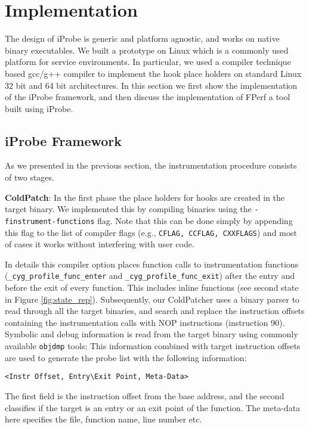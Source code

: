 \section{Implementation}
\label{sec:Implementation}

The design of iProbe is generic and platform agnostic, and works on native binary executables. 
We built a prototype on Linux which is a commonly used platform for service environments. 
In particular, we used a compiler technique based gcc/g++ compiler to implement the hook place holders on standard Linux 32 bit and 64 bit architectures. 
In this section we first show the implementation of the iProbe framework, and then discuss the implementation of FPerf a tool built using iProbe.

\subsection{iProbe Framework}
As we presented in the previous section, the instrumentation procedure consists of two stages.

\indent \textbf{ColdPatch}: In the first phase the place holders for hooks are created in the target binary. 
We implemented this by compiling binaries using the \texttt{-finstrument-functions} flag. 
Note that this can be done simply by appending this flag to the list of compiler flags (e.g., \texttt{CFLAG, CCFLAG, CXXFLAGS}) and most of cases it works without interfering with user code. 

In details this compiler option places function calls to instrumentation functions (\texttt{\_cyg\_profile\_func\_enter} and \texttt{\_cyg\_profile\_func\_exit})  after the entry and before the exit of every function. 
This includes inline functions (see second state in Figure \ref{fig:state_rep}). 
Subsequently, our ColdPatcher uses a binary parser to read through all the target binaries, and search and replace the instruction offsets containing the instrumentation calls with NOP instructions (instruction 90). 
Symbolic and debug information is read from the target binary using commonly available \texttt{objdmp} tools; 
This information combined with target instruction offsets are used to generate the probe list with the following information:
\begin{verbatim}
<Instr Offset, Entry\Exit Point, Meta-Data>
\end{verbatim}
The first field is the instruction offset from the base address, and the second classifies if the target is an entry or an exit point of the function. 
The meta-data here specifies the file, function name, line number etc. 

